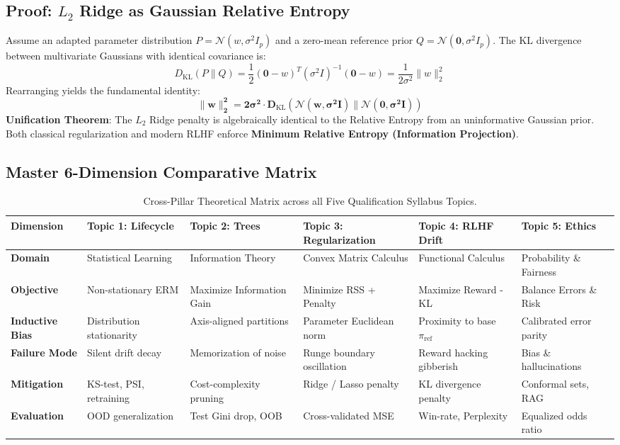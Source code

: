 \documentclass[11pt,a4paper]{article}
\theoremstyle{definition}
\theoremstyle{plain}
\theoremstyle{remark}
\newcommand{\KL}[2]{D_{\mathrm{KL}}\left(#1 \parallel #2\right)}
\begin{document}
\subsection[Proof: L2 Ridge as Gaussian Relative Entropy]{Proof: $L_2$ Ridge as Gaussian Relative Entropy}
Assume an adapted parameter distribution $P = \mathcal{N}(w, \sigma^2 I_p)$ and a zero-mean reference prior $Q = \mathcal{N}(\mathbf{0}, \sigma^2 I_p)$.
The KL divergence between multivariate Gaussians with identical covariance is:
\begin{equation}
\KL{P}{Q} = \frac{1}{2} (\mathbf{0} - w)^T (\sigma^2 I)^{-1} (\mathbf{0} - w) = \frac{1}{2\sigma^2} \|w\|_2^2
\end{equation}
Rearranging yields the fundamental identity:
\begin{equation}
\mathbf{\|w\|_2^2 = 2\sigma^2 \cdot \KL{\mathcal{N}(w, \sigma^2 I)}{\mathcal{N}(\mathbf{0}, \sigma^2 I)}}
\end{equation}
\textbf{Unification Theorem}: The $L_2$ Ridge penalty is algebraically identical to the Relative Entropy from an uninformative Gaussian prior. Both classical regularization and modern RLHF enforce \textbf{Minimum Relative Entropy (Information Projection)}.

\subsection{Master 6-Dimension Comparative Matrix}
\begin{table}[htbp]
\centering
\scriptsize
\caption{Cross-Pillar Theoretical Matrix across all Five Qualification Syllabus Topics.}
\label{tab:master_matrix}
\begin{tabularx}{\textwidth}{l p{2.2cm} p{2.2cm} p{2.2cm} p{2.2cm} p{2.2cm}}
\toprule
\textbf{Dimension} & \textbf{Topic 1: Lifecycle} & \textbf{Topic 2: Trees} & \textbf{Topic 3: Regularization} & \textbf{Topic 4: RLHF Drift} & \textbf{Topic 5: Ethics} \\
\midrule
\textbf{Domain} & Statistical Learning & Information Theory & Convex Matrix Calculus & Functional Calculus & Probability \& Fairness \\
\textbf{Objective} & Non-stationary ERM & Maximize Information Gain & Minimize RSS + Penalty & Maximize Reward - KL & Balance Errors \& Risk \\
\textbf{Inductive Bias} & Distribution stationarity & Axis-aligned partitions & Parameter Euclidean norm & Proximity to base $\pi_{\mathrm{ref}}$ & Calibrated error parity \\
\textbf{Failure Mode} & Silent drift decay & Memorization of noise & Runge boundary oscillation & Reward hacking gibberish & Bias \& hallucinations \\
\textbf{Mitigation} & KS-test, PSI, retraining & Cost-complexity pruning & Ridge / Lasso penalty & KL divergence penalty & Conformal sets, RAG \\
\textbf{Evaluation} & OOD generalization & Test Gini drop, OOB & Cross-validated MSE & Win-rate, Perplexity & Equalized odds ratio \\
\bottomrule
\end{tabularx}
\end{table}
\end{document}
